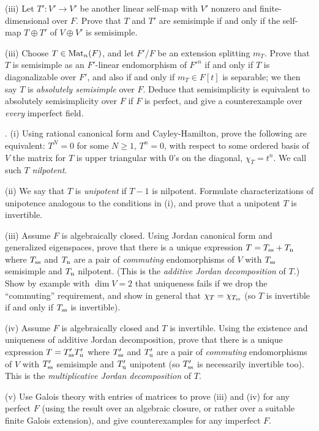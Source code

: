 \documentclass[10pt]{article}
\renewcommand{\(}{\left(}
\renewcommand{\)}{\right)}
\numberwithin{thm}{subsection}
\begin{document}
(iii) Let $T':V' \rightarrow V'$ be another linear self-map with $V'$ nonzero and finite-dimensional over $F$.
Prove that $T$ and $T'$ are semisimple if and only if the self-map 
$T \oplus T'$ of $V \oplus V'$ is semisimple. 

(iii) Choose $T \in {\rm{Mat}}_n(F)$, and let $F'/F$ be an extension splitting $m_T$.  
Prove that $T$ is semisimple as an $F'$-linear endomorphism of ${F'}^n$ if and only if $T$ is diagonalizable
over $F'$, and also if and only if $m_T \in F[t]$ is separable;
we then say $T$ is {\em absolutely semisimple} over $F$.  Deduce that semisimplicity is equivalent to absolutely
semisimplicity over $F$ if $F$ is perfect, and give a counterexample over {\em every} imperfect field. 

\medskip{}. (i) Using rational canonical form and Cayley-Hamilton,
prove the following are equivalent:  $T^N = 0$ for some $N \ge 1$, $T^n = 0$, with respect to some ordered basis of $V$ the matrix for 
$T$ is upper triangular with 0's on the diagonal, $\chi_T = t^n$.   We call such $T$ {\em nilpotent}.

(ii) We say that $T$ is {\em unipotent} if $T - 1$ is nilpotent.  Formulate characterizations of unipotence analogous to the conditions in (i),
and prove that a unipotent $T$ is invertible. 

(iii) Assume $F$ is algebraically closed.  Using Jordan canonical form and generalized eigenspaces, prove that 
there is a unique expression
$T = T_{\rm{ss}} + T_{\rm{n}}$ where $T_{\rm{ss}}$ and $T_{\rm{n}}$ are a pair of {\em commuting}
endomorphisms of $V$ with $T_{\rm{ss}}$ semisimple and $T_{\rm{n}}$ nilpotent.  (This is the {\em additive
Jordan decomposition} of $T$.) Show by example with $\dim V = 2$ that uniqueness fails if we drop
the ``commuting'' requirement, and show in general that
$\chi_T = \chi_{T_{\rm{ss}}}$ (so $T$ is invertible if and only if $T_{\rm{ss}}$ is invertible).

(iv) Assume $F$ is algebraically closed and $T$ is invertible.  Using the existence and uniqueness of additive Jordan decomposition,
prove that there is a unique expression
$T = T'_{\rm{ss}} T'_{\rm{u}}$ where $T'_{\rm{ss}}$ and $T'_{\rm{u}}$ are a pair of {\em commuting}
endomorphisms of $V$ with $T'_{\rm{ss}}$ semisimple and $T'_{\rm{u}}$ unipotent (so $T'_{\rm{ss}}$ is necessarily
invertible too).  This is the {\em multiplicative Jordan decomposition} of $T$. 

(v) Use Galois theory with entries of matrices to prove (iii) and (iv) for any perfect $F$ (using the result
over an algebraic closure, or rather over a suitable finite Galois extension), and give counterexamples for any imperfect $F$. 
\end{document}
